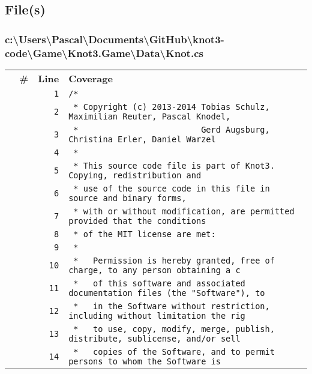 \documentclass[a4paper,10pt]{article}
\begin{document}
\subsection{File(s)}
\subsubsection{c:\textbackslash Users\textbackslash Pascal\textbackslash Documents\textbackslash GitHub\textbackslash knot3-code\textbackslash Game\textbackslash Knot3.Game\textbackslash Data\textbackslash Knot.cs}
\begin{longtable}[l]{lrrl}
\textbf{} & \textbf{\#} & \textbf{Line} & \textbf{Coverage}\\
\cellcolor{gray} &  & \verb~1~ & \verb~/*~\\
\cellcolor{gray} &  & \verb~2~ & \verb~ * Copyright (c) 2013-2014 Tobias Schulz, Maximilian Reuter, Pascal Knodel,~\\
\cellcolor{gray} &  & \verb~3~ & \verb~ *                         Gerd Augsburg, Christina Erler, Daniel Warzel~\\
\cellcolor{gray} &  & \verb~4~ & \verb~ *~\\
\cellcolor{gray} &  & \verb~5~ & \verb~ * This source code file is part of Knot3. Copying, redistribution and~\\
\cellcolor{gray} &  & \verb~6~ & \verb~ * use of the source code in this file in source and binary forms,~\\
\cellcolor{gray} &  & \verb~7~ & \verb~ * with or without modification, are permitted provided that the conditions~\\
\cellcolor{gray} &  & \verb~8~ & \verb~ * of the MIT license are met:~\\
\cellcolor{gray} &  & \verb~9~ & \verb~ *~\\
\cellcolor{gray} &  & \verb~10~ & \verb~ *   Permission is hereby granted, free of charge, to any person obtaining a c~\\
\cellcolor{gray} &  & \verb~11~ & \verb~ *   of this software and associated documentation files (the "Software"), to ~\\
\cellcolor{gray} &  & \verb~12~ & \verb~ *   in the Software without restriction, including without limitation the rig~\\
\cellcolor{gray} &  & \verb~13~ & \verb~ *   to use, copy, modify, merge, publish, distribute, sublicense, and/or sell~\\
\cellcolor{gray} &  & \verb~14~ & \verb~ *   copies of the Software, and to permit persons to whom the Software is~\\

\end{longtable}
\end{document}

